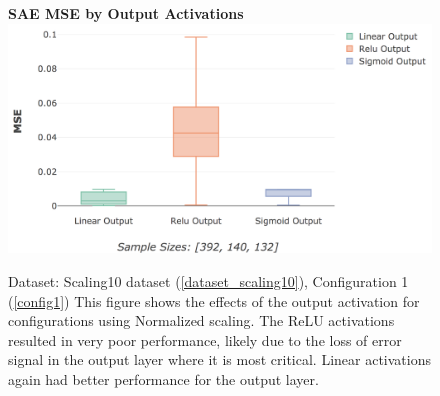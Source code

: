 \documentclass[a4paper,11pt,oneside]{article}
\theoremstyle{plain}
\theoremstyle{definition}
\begin{document}
	\begin{figure}[H]
		\begin{center}
			\centering
			\textbf{SAE MSE by Output Activations}
			\includegraphics[scale=0.4]{images/results/8_7_network/actual_mse_output.png}
			\caption[MSE by Output Activations]
			{Dataset: Scaling10 dataset (\ref{dataset_scaling10}), Configuration 1 (\ref{config1})
				\newline This figure shows the effects of the output activation for configurations using Normalized scaling. The ReLU activations resulted in very poor performance, likely due to the loss of error signal in the output layer where it is most critical. Linear activations again had better performance for the output layer. }
			\label{figure-actual_mse_output}
		\end{center}
	\end{figure}
		
\end{document}
